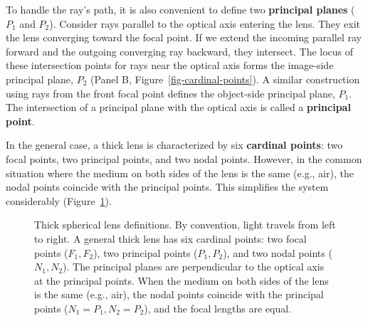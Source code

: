 \documentclass[
  letterpaper,
]{book}
\begin{document}
To handle the ray's path, it is also convenient to define two
\textbf{principal planes} (\(P_1\) and \(P_2\)). Consider rays parallel
to the optical axis entering the lens. They exit the lens converging
toward the focal point. If we extend the incoming parallel ray forward
and the outgoing converging ray backward, they intersect. The locus of
these intersection points for rays near the optical axis forms the
image-side principal plane, \(P_2\) (Panel B,
Figure~\ref{fig-cardinal-points}). A similar construction using rays
from the front focal point defines the object-side principal plane,
\(P_1\). The intersection of a principal plane with the optical axis is
called a \textbf{principal point}.

In the general case, a thick lens is characterized by six
\textbf{cardinal points}: two focal points, two principal points, and
two nodal points. However, in the common situation where the medium on
both sides of the lens is the same (e.g., air), the nodal points
coincide with the principal points. This simplifies the system
considerably (Figure~\ref{fig-thick-cardinal}).

\begin{figure}


\caption{\label{fig-thick-cardinal}Thick spherical lens definitions. By
convention, light travels from left to right. A general thick lens has
six cardinal points: two focal points (\(F_1, F_2\)), two principal
points (\(P_1, P_2\)), and two nodal points (\(N_1, N_2\)). The
principal planes are perpendicular to the optical axis at the principal
points. When the medium on both sides of the lens is the same (e.g.,
air), the nodal points coincide with the principal points
(\(N_1=P_1, N_2=P_2\)), and the focal lengths are equal.}

\end{figure}%
\end{document}
